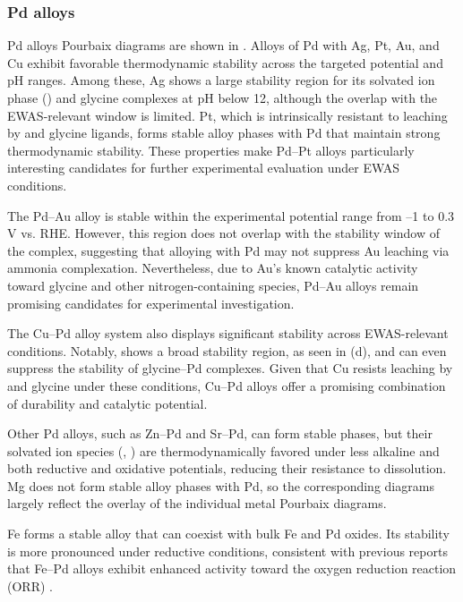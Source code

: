 \documentclass[journal=jacsat,manuscript=article]{achemso}
\begin{document}
\subsubsection{Pd alloys}
Pd alloys Pourbaix diagrams are shown in . Alloys of Pd with Ag, Pt, Au, and Cu exhibit favorable thermodynamic stability across the targeted potential and pH ranges. Among these, Ag shows a large stability region for its solvated ion phase () and glycine complexes at pH below 12, although the overlap with the EWAS-relevant window is limited. Pt, which is intrinsically resistant to leaching by  and glycine ligands, forms stable alloy phases with Pd that maintain strong thermodynamic stability. These properties make Pd–Pt alloys particularly interesting candidates for further experimental evaluation under EWAS conditions.

The Pd–Au alloy  is stable within the experimental potential range from –1 to 0.3 V vs. RHE. However, this region does not overlap with the stability window of the \ce{[Au(NH3)_2]^+} complex, suggesting that alloying with Pd may not suppress Au leaching via ammonia complexation. Nevertheless, due to Au’s known catalytic activity toward glycine and other nitrogen-containing species, Pd–Au alloys remain promising candidates for experimental investigation.

The Cu–Pd alloy system also displays significant stability across EWAS-relevant conditions. Notably,  shows a broad stability region, as seen in (d), and can even suppress the stability of glycine–Pd complexes. Given that Cu resists leaching by  and glycine under these conditions, Cu–Pd alloys offer a promising combination of durability and catalytic potential.

Other Pd alloys, such as Zn–Pd and Sr–Pd, can form stable phases, but their solvated ion species (, ) are thermodynamically favored under less alkaline and both reductive and oxidative potentials, reducing their resistance to dissolution. Mg does not form stable alloy phases with Pd, so the corresponding diagrams largely reflect the overlay of the individual metal Pourbaix diagrams.

Fe forms a stable  alloy that can coexist with bulk Fe and Pd oxides. Its stability is more pronounced under reductive conditions, consistent with previous reports that Fe–Pd alloys exhibit enhanced activity toward the oxygen reduction reaction (ORR) \cite{Ou2015DesignStudy}.
\end{document}

